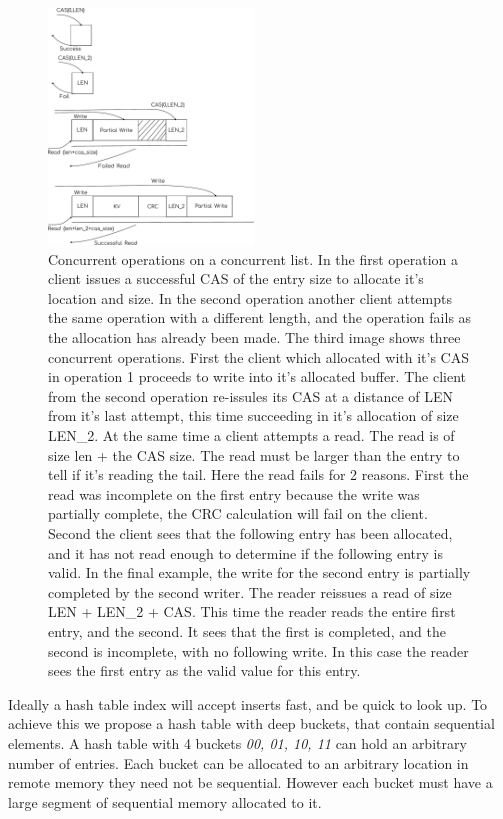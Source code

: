 \begin{figure}[t] \includegraphics[width=0.485\textwidth]{fig/AppendList.pdf}
\caption{Concurrent operations on a concurrent list. In the first operation a client
issues a successful CAS of the entry size to allocate it's location and size. In
the second operation another client attempts the same operation with a different
length, and the operation fails as the allocation has already been made. The
third image shows three concurrent operations. First the client which allocated
with it's CAS in operation 1 proceeds to write into it's allocated buffer. The
client from the second operation re-issules its CAS at a distance of LEN from
it's last attempt, this time succeeding in it's allocation of size LEN\_2. At the
same time a client attempts a read. The read is of size len + the CAS size. The
read must be larger than the entry to tell if it's reading the tail. Here the
read fails for 2 reasons. First the read was incomplete on the first entry
because the write was partially complete, the CRC calculation will fail on the
client. Second the client sees that the following entry has been allocated, and
it has not read enough to determine if the following entry is valid. In the
final example, the write for the second entry is partially completed by the
second writer. The reader reissues a read of size {LEN + LEN\_2 + CAS}. This time
the reader reads the entire first entry, and the second. It sees that the first
is completed, and the second is incomplete, with no following write. In this
case the reader sees the first entry as the valid value for this entry.}
\label{fig:cas_vs_swap}
\end{figure}


Ideally a hash table index will accept inserts fast, and be quick to look up. To
achieve this we propose a hash table with deep buckets, that contain sequential
elements. A hash table with 4 buckets \textit{00, 01, 10, 11} can hold an
arbitrary number of entries. Each bucket can be allocated to an arbitrary
location in remote memory they need not be sequential. However each bucket must
have a large segment of sequential memory allocated to it.

